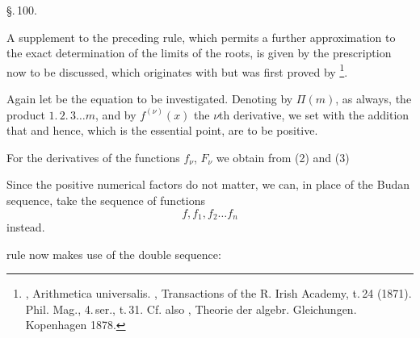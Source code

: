 
\begin{center}
\S.\,100.

\end{center}

A supplement to the preceding rule, which permits a further
approximation to the exact determination of the limits of the roots, is
given by the prescription now to be discussed, which originates with
 but was first proved by
\footnote{,
Arithmetica universalis. , Transactions of the
R. Irish Academy, t.\,24 (1871). Phil. Mag., 4.\,ser., t.\,31. Cf. also
, Theorie der algebr. Gleichungen. Kopenhagen 1878.}.

Again let
be the equation to be investigated. Denoting by $\Pi(m)$, as always,
the product $1.\,2.\,3 \ldots m$, and by $f^{(\nu)}(x)$ the $\nu$th
derivative, we set
with the addition that
and hence, which is the essential point, are to be positive.

For the derivatives of the functions $f_\nu$, $F_\nu$ we obtain from
(2) and (3)

Since the positive numerical factors do not matter, we can, in place of
the Budan sequence, take the sequence of functions
\[
f, f_1, f_2 \ldots f_n
\]
instead.

 rule now makes use of the double sequence:
